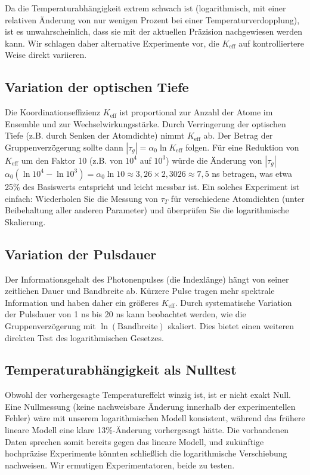 \documentclass[12pt,a4paper]{article}
\newcommand{\Keff}{K_{\mathrm{eff}}}
\begin{document}
	Da die Temperaturabhängigkeit extrem schwach ist (logarithmisch, mit einer relativen Änderung von nur wenigen Prozent bei einer Temperaturverdopplung), ist es unwahrscheinlich, dass sie mit der aktuellen Präzision nachgewiesen werden kann. Wir schlagen daher alternative Experimente vor, die \(\Keff\) auf kontrolliertere Weise direkt variieren.
	
	\subsection{Variation der optischen Tiefe}
	
	Die Koordinationseffizienz \(\Keff\) ist proportional zur Anzahl der Atome im Ensemble und zur Wechselwirkungsstärke. Durch Verringerung der optischen Tiefe (z.B. durch Senken der Atomdichte) nimmt \(\Keff\) ab. Der Betrag der Gruppenverzögerung sollte dann \(|\tau_g| = \alpha_0 \ln\Keff\) folgen. Für eine Reduktion von \(\Keff\) um den Faktor 10 (z.B. von \(10^4\) auf \(10^3\)) würde die Änderung von \(|\tau_g|\) \(\alpha_0 (\ln 10^4 - \ln 10^3) = \alpha_0 \ln 10 \approx 3,26 \times 2,3026 \approx 7,5\) ns betragen, was etwa 25\% des Basiswerts entspricht und leicht messbar ist. Ein solches Experiment ist einfach: Wiederholen Sie die Messung von \(\tau_T\) für verschiedene Atomdichten (unter Beibehaltung aller anderen Parameter) und überprüfen Sie die logarithmische Skalierung.
	
	\subsection{Variation der Pulsdauer}
	
	Der Informationsgehalt des Photonenpulses (die Indexlänge) hängt von seiner zeitlichen Dauer und Bandbreite ab. Kürzere Pulse tragen mehr spektrale Information und haben daher ein größeres \(\Keff\). Durch systematische Variation der Pulsdauer von 1 ns bis 20 ns kann beobachtet werden, wie die Gruppenverzögerung mit \(\ln(\text{Bandbreite})\) skaliert. Dies bietet einen weiteren direkten Test des logarithmischen Gesetzes.
	
	\subsection{Temperaturabhängigkeit als Nulltest}
	
	Obwohl der vorhergesagte Temperatureffekt winzig ist, ist er nicht exakt Null. Eine Nullmessung (keine nachweisbare Änderung innerhalb der experimentellen Fehler) wäre mit unserem logarithmischen Modell konsistent, während das frühere lineare Modell eine klare 13\%-Änderung vorhergesagt hätte. Die vorhandenen Daten sprechen somit bereits gegen das lineare Modell, und zukünftige hochpräzise Experimente könnten schließlich die logarithmische Verschiebung nachweisen. Wir ermutigen Experimentatoren, beide zu testen.
	
\end{document}
